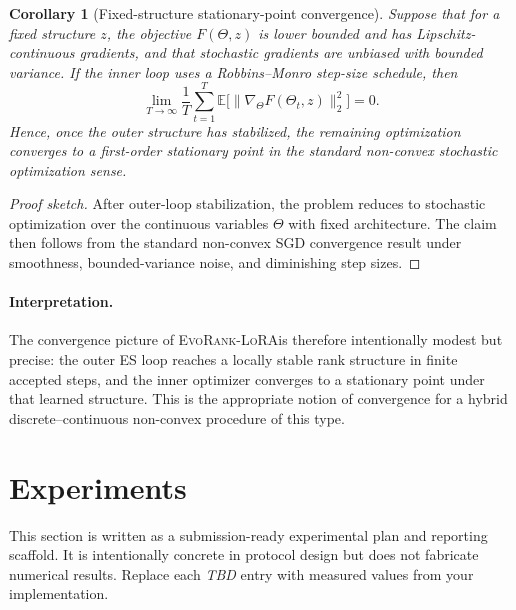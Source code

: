 \documentclass{article}
\newtheorem{corollary}{Corollary}
\newcommand{\method}{\textsc{EvoRank-LoRA}}
\newcommand{\TODO}{\textit{TBD}}
\begin{document}
\begin{corollary}[Fixed-structure stationary-point convergence]
\label{cor:fixed_structure_sgd}
Suppose that for a fixed structure $z$, the objective $F(\Theta, z)$ is lower bounded and has Lipschitz-continuous gradients, and that stochastic gradients are unbiased with bounded variance. If the inner loop uses a Robbins--Monro step-size schedule, then
\begin{equation}
    \lim_{T \to \infty} \frac{1}{T} \sum_{t=1}^{T} \mathbb{E}\bigl[\|\nabla_{\Theta} F(\Theta_t, z)\|_2^2\bigr] = 0.
\end{equation}
Hence, once the outer structure has stabilized, the remaining optimization converges to a first-order stationary point in the standard non-convex stochastic optimization sense.
\end{corollary}

\begin{proof}[Proof sketch]
After outer-loop stabilization, the problem reduces to stochastic optimization over the continuous variables $\Theta$ with fixed architecture. The claim then follows from the standard non-convex SGD convergence result under smoothness, bounded-variance noise, and diminishing step sizes.
\end{proof}

\paragraph{Interpretation.}
The convergence picture of \method is therefore intentionally modest but precise: the outer ES loop reaches a locally stable rank structure in finite accepted steps, and the inner optimizer converges to a stationary point under that learned structure. This is the appropriate notion of convergence for a hybrid discrete--continuous non-convex procedure of this type.

\section{Experiments}
\label{sec:exp}

This section is written as a submission-ready experimental plan and reporting scaffold. It is intentionally concrete in protocol design but does not fabricate numerical results. Replace each \TODO{} entry with measured values from your implementation.
\end{document}
